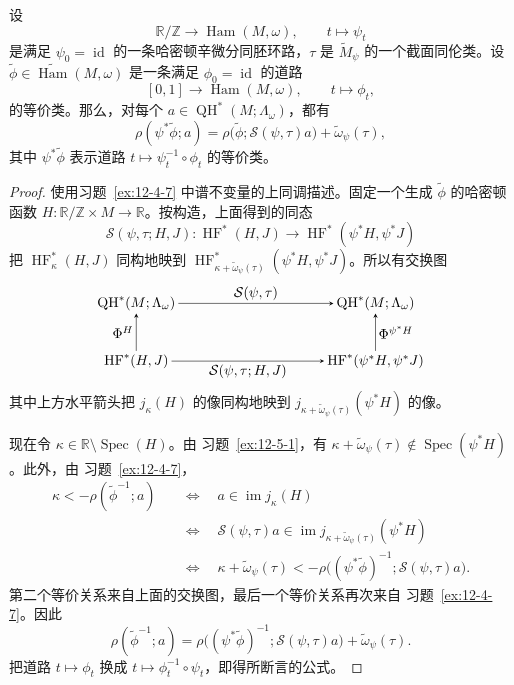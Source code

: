 \begin{lemma}\label{lem:12-5-3}
设
\[
  \mathbb R/\mathbb Z\longrightarrow\operatorname{Ham}(M,\omega),
  \qquad t\longmapsto\psi_t
\]
是满足 $\psi_0=\operatorname{id}$ 的一条哈密顿辛微分同胚环路，$\tau$ 是
$\widetilde M_\psi$ 的一个截面同伦类。设
$\widetilde\phi\in\widetilde{\operatorname{Ham}}(M,\omega)$ 是一条满足
$\phi_0=\operatorname{id}$ 的道路
\[
  [0,1]\longrightarrow\operatorname{Ham}(M,\omega),
  \qquad t\longmapsto\phi_t,
\]
的等价类。那么，对每个
$a\in\operatorname{QH}^*(M;\Lambda_\omega)$，都有
\[
  \rho(\psi^*\widetilde\phi;a)
  =\rho\bigl(\widetilde\phi;\mathcal S(\psi,\tau)a\bigr)
   +\widetilde\omega_\psi(\tau),
\]
其中 $\psi^*\widetilde\phi$ 表示道路
$t\mapsto\psi_t^{-1}\circ\phi_t$ 的等价类。
\end{lemma}

\begin{proof}
使用习题~\ref{ex:12-4-7} 中谱不变量的上同调描述。固定一个生成
$\widetilde\phi$ 的哈密顿函数
$H:\mathbb R/\mathbb Z\times M\to\mathbb R$。按构造，上面得到的同态
\[
  \mathcal S(\psi,\tau;H,J):
  \operatorname{HF}^*(H,J)
  \longrightarrow
  \operatorname{HF}^*(\psi^*H,\psi^*J)
\]
把 $\operatorname{HF}_\kappa^*(H,J)$ 同构地映到
$\operatorname{HF}_{\kappa+\widetilde\omega_\psi(\tau)}^*
(\psi^*H,\psi^*J)$。所以有交换图
\[
\begin{tikzpicture}[baseline=(current bounding box.center),>=stealth,
  every node/.style={inner sep=2pt}]
  \node (q1) at (0,1.45) {$\operatorname{QH}^*(M;\Lambda_\omega)$};
  \node (q2) at (6.0,1.45) {$\operatorname{QH}^*(M;\Lambda_\omega)$};
  \node (h1) at (0,0) {$\operatorname{HF}^*(H,J)$};
  \node (h2) at (6.0,0) {$\operatorname{HF}^*(\psi^*H,\psi^*J)$};
  \draw[->] (q1) -- node[above] {$\mathcal S(\psi,\tau)$} (q2);
  \draw[->] (h1) -- node[below] {$\mathcal S(\psi,\tau;H,J)$} (h2);
  \draw[->] (h1) -- node[left] {$\Phi^H$} (q1);
  \draw[->] (h2) -- node[right] {$\Phi^{\psi^*H}$} (q2);
\end{tikzpicture}
\]
其中上方水平箭头把 $j_\kappa(H)$ 的像同构地映到
$j_{\kappa+\widetilde\omega_\psi(\tau)}(\psi^*H)$ 的像。

现在令 $\kappa\in\mathbb R\setminus\operatorname{Spec}(H)$。由
习题~\ref{ex:12-5-1}，有
$\kappa+\widetilde\omega_\psi(\tau)\notin\operatorname{Spec}(\psi^*H)$。此外，由
习题~\ref{ex:12-4-7}，
\[
\begin{aligned}
  \kappa<-\rho(\widetilde\phi^{-1};a)
  &\quad\Longleftrightarrow\quad
  a\in\operatorname{im}j_\kappa(H)\\
  &\quad\Longleftrightarrow\quad
  \mathcal S(\psi,\tau)a
  \in\operatorname{im}j_{\kappa+\widetilde\omega_\psi(\tau)}(\psi^*H)\\
  &\quad\Longleftrightarrow\quad
  \kappa+\widetilde\omega_\psi(\tau)
  <-\rho\bigl((\psi^*\widetilde\phi)^{-1};
  \mathcal S(\psi,\tau)a\bigr).
\end{aligned}
\]
第二个等价关系来自上面的交换图，最后一个等价关系再次来自
习题~\ref{ex:12-4-7}。因此
\[
  \rho(\widetilde\phi^{-1};a)
  =\rho\bigl((\psi^*\widetilde\phi)^{-1};
  \mathcal S(\psi,\tau)a\bigr)
   +\widetilde\omega_\psi(\tau).
\]
把道路 $t\mapsto\phi_t$ 换成 $t\mapsto\phi_t^{-1}\circ\psi_t$，即得所断言的公式。
\end{proof}

